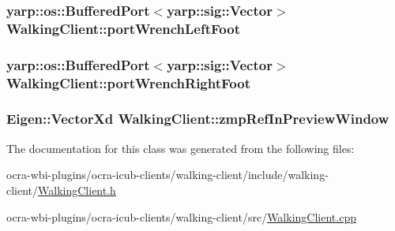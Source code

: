 \hypertarget{classWalkingClient_a88ee63ff6a341eccd458d24700383457}{
\subsubsection[{port\-Wrench\-Left\-Foot}]{\setlength{\rightskip}{0pt plus 5cm}yarp\-::os\-::\-Buffered\-Port$<$yarp\-::sig\-::\-Vector$>$ {\bf \-Walking\-Client\-::port\-Wrench\-Left\-Foot}}}\label{classWalkingClient_a88ee63ff6a341eccd458d24700383457}
\hypertarget{classWalkingClient_a96321dc60e84c193f2dea6e85983ca67}{
\subsubsection[{port\-Wrench\-Right\-Foot}]{\setlength{\rightskip}{0pt plus 5cm}yarp\-::os\-::\-Buffered\-Port$<$yarp\-::sig\-::\-Vector$>$ {\bf \-Walking\-Client\-::port\-Wrench\-Right\-Foot}}}\label{classWalkingClient_a96321dc60e84c193f2dea6e85983ca67}
\hypertarget{classWalkingClient_af28b3cd3b1202f83e193b098572fbdd3}{
\subsubsection[{zmp\-Ref\-In\-Preview\-Window}]{\setlength{\rightskip}{0pt plus 5cm}\-Eigen\-::\-Vector\-Xd {\bf \-Walking\-Client\-::zmp\-Ref\-In\-Preview\-Window}}}\label{classWalkingClient_af28b3cd3b1202f83e193b098572fbdd3}


\-The documentation for this class was generated from the following files\-:\begin{DoxyCompactItemize}
\item 
ocra-\/wbi-\/plugins/ocra-\/icub-\/clients/walking-\/client/include/walking-\/client/\hyperlink{WalkingClient_8h}{\-Walking\-Client.\-h}\item 
ocra-\/wbi-\/plugins/ocra-\/icub-\/clients/walking-\/client/src/\hyperlink{WalkingClient_8cpp}{\-Walking\-Client.\-cpp}\end{DoxyCompactItemize}
